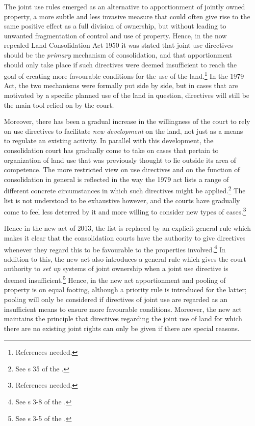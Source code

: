 The joint use rules emerged as an alternative to apportionment of jointly owned property, a more subtle and less invasive measure that could often give rise to the same positive effect as a full division of ownership, but without leading to unwanted fragmentation of control and use of property. Hence, in the now repealed Land Consolidation Act 1950 it was stated that joint use directives should be the \emph{primary} mechanism of consolidation, and that apportionment should only take place if such directives were deemed insufficient to reach the goal of creating more favourable conditions for the use of the land.\footnote{References needed.} In the 1979 Act, the two mechanisms were formally put side by side, but in cases that are motivated by a specific planned use of the land in question, directives will still be the main tool relied on by the court.

Moreover, there has been a gradual increase in the willingness of the court to rely on use directives to facilitate \emph{new development} on the land, not just as a means to regulate an existing activity. In parallel with this development, the consolidation court has gradually come to take on cases that pertain to organization of land use that was previously thought to lie outside its area of competence. The more restricted view on use directives and on the function of consolidation in general is reflected in the way the 1979 act lists a range of different concrete circumstances in which such directives might be applied.\footnote{See s 35 of the \cite{lca79}.} The list is not understood to be exhaustive however, and the courts have gradually come to feel less deterred by it and more willing to consider new types of cases.\footnote{References needed.}

Hence in the new act of 2013, the list is replaced by an explicit general rule which makes it clear that the  consolidation courts have the authority to give directives whenever they regard this to be favourable to the properties involved.\footnote{See s 3-8 of the \cite{lca13}.} In addition to this, the new act also introduces a general rule which gives the court authority to \emph{set up} systems of joint ownership when a joint use directive is deemed insufficient.\footnote{See s 3-5 of the \cite{lca13}.} Hence, in the new act apportionment and pooling of property is on equal footing, although a priority rule is introduced for the latter; pooling will only be considered if directives of joint use are regarded as an insufficient means to ensure more favourable conditions. Moreover, the new act maintains the principle that directives regarding the joint use of land for which there are no existing joint rights can only be given if there are special reasons.

